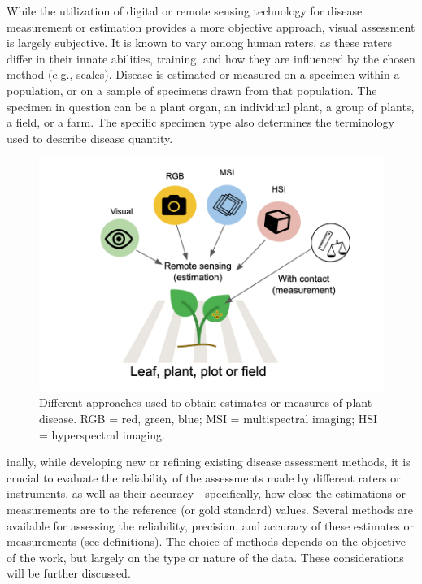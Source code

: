 \documentclass[
  letterpaper,
]{book}
\begin{document}
While the utilization of digital or remote sensing technology for
disease measurement or estimation provides a more objective approach,
visual assessment is largely subjective. It is known to vary among human
raters, as these raters differ in their innate abilities, training, and
how they are influenced by the chosen method (e.g., scales). Disease is
estimated or measured on a specimen within a population, or on a sample
of specimens drawn from that population. The specimen in question can be
a plant organ, an individual plant, a group of plants, a field, or a
farm. The specific specimen type also determines the terminology used to
describe disease quantity.

\begin{figure}

{\centering \includegraphics[width=5.10417in,height=\textheight]{imgs/disease_measure.png}

}

\caption{\label{fig-disease_measure}Different approaches used to obtain
estimates or measures of plant disease. RGB = red, green, blue; MSI =
multispectral imaging; HSI = hyperspectral imaging.}

\end{figure}

inally, while developing new or refining existing disease assessment
methods, it is crucial to evaluate the reliability of the assessments
made by different raters or instruments, as well as their
accuracy---specifically, how close the estimations or measurements are
to the reference (or gold standard) values. Several methods are
available for assessing the reliability, precision, and accuracy of
these estimates or measurements (see
\href{data-accuracy.html}{definitions}). The choice of methods depends
on the objective of the work, but largely on the type or nature of the
data. These considerations will be further discussed.
\end{document}
